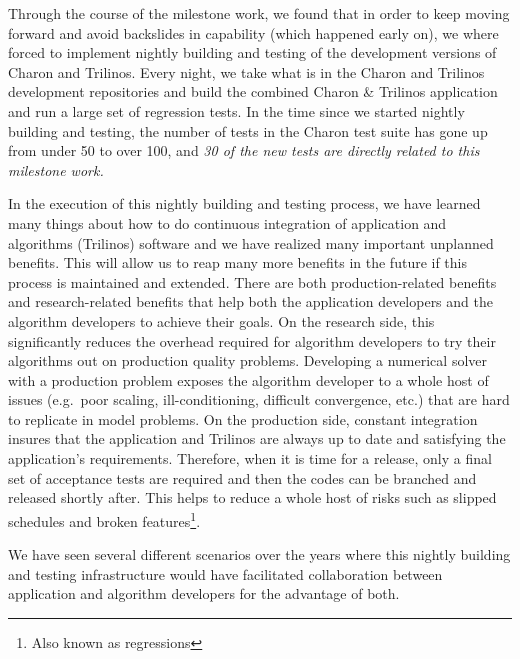 \documentclass[pdf,ps2pdf,11pt]{SANDreport}
\begin{document}
Through the course of the milestone work, we found that in order to keep
moving forward and avoid backslides in capability (which happened early on),
we where forced to implement nightly building and testing of the development
versions of Charon and Trilinos.  Every night, we take what is in the Charon
and Trilinos development repositories and build the combined Charon \&
Trilinos application and run a large set of regression tests.  In the time
since we started nightly building and testing, the number of tests in the
Charon test suite has gone up from under 50 to over 100, and {\em 30 of the
new tests are directly related to this milestone work.}

In the execution of this nightly building and testing process, we have learned
many things about how to do continuous integration {}\cite{continuous-integration}
of application and
algorithms (Trilinos) software and we have realized many important unplanned
benefits.  This will allow us to reap many more benefits in the future if this
process is maintained
and extended.  There are both production-related benefits and research-related
benefits that help both the application developers and the algorithm
developers to achieve their goals.  On the research side, this significantly
reduces the overhead required for algorithm developers to try their algorithms
out on production quality problems.  Developing a numerical solver with a
production problem exposes the algorithm developer to a whole host of issues
(e.g.\ poor scaling, ill-conditioning, difficult convergence, etc.) that are
hard to replicate in model problems.  On the production side, constant
integration insures that the application and Trilinos are always up to date
and satisfying the application's requirements.  Therefore, when it is time for
a release, only a final set of acceptance tests are required and then the
codes can be branched and released shortly after.  This helps to reduce a
whole host of risks such as slipped schedules and broken
features\footnote{Also known as regressions}.



We have seen several different scenarios over the years where this nightly
building and testing infrastructure would have facilitated collaboration
between application and algorithm developers for the advantage of both.
\end{document}
